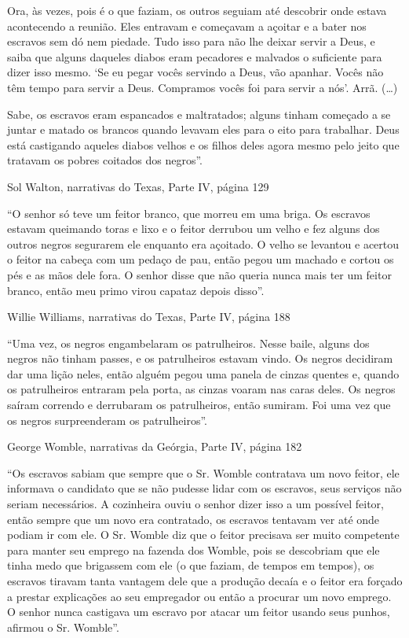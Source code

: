 Ora, às vezes, pois é o que faziam, os outros seguiam até descobrir onde
estava acontecendo a reunião. Eles entravam e começavam a açoitar e a
bater nos escravos sem dó nem piedade. Tudo isso para não lhe deixar
servir a Deus, e saiba que alguns daqueles diabos eram pecadores e
malvados o suficiente para dizer isso mesmo. `Se eu pegar vocês servindo
a Deus, vão apanhar. Vocês não têm tempo para servir a Deus. Compramos
vocês foi para servir a nós'. Arrã. (\ldots{})

Sabe, os escravos eram espancados e maltratados; alguns tinham começado
a se juntar e matado os brancos quando levavam eles para o eito para
trabalhar. Deus está castigando aqueles diabos velhos e os filhos deles
agora mesmo pelo jeito que tratavam os pobres coitados dos negros''.

Sol Walton, narrativas do Texas, Parte IV, página 129

``O senhor só teve um feitor branco, que morreu em uma briga. Os
escravos estavam queimando toras e lixo e o feitor derrubou um velho e
fez alguns dos outros negros segurarem ele enquanto era açoitado. O
velho se levantou e acertou o feitor na cabeça com um pedaço de pau,
então pegou um machado e cortou os pés e as mãos dele fora. O senhor
disse que não queria nunca mais ter um feitor branco, então meu primo
virou capataz depois disso''.

Willie Williams, narrativas do Texas, Parte IV, página 188

``Uma vez, os negros engambelaram os patrulheiros. Nesse baile, alguns
dos negros não tinham passes, e os patrulheiros estavam vindo. Os negros
decidiram dar uma lição neles, então alguém pegou uma panela de cinzas
quentes e, quando os patrulheiros entraram pela porta, as cinzas voaram
nas caras deles. Os negros saíram correndo e derrubaram os patrulheiros,
então sumiram. Foi uma vez que os negros surpreenderam os
patrulheiros''.

George Womble, narrativas da Geórgia, Parte IV, página 182

``Os escravos sabiam que sempre que o Sr. Womble contratava um novo
feitor, ele informava o candidato que se não pudesse lidar com os
escravos, seus serviços não seriam necessários. A cozinheira ouviu o
senhor dizer isso a um possível feitor, então sempre que um novo era
contratado, os escravos tentavam ver até onde podiam ir com ele. O Sr.
Womble diz que o feitor precisava ser muito competente para manter seu
emprego na fazenda dos Womble, pois se descobriam que ele tinha medo que
brigassem com ele (o que faziam, de tempos em tempos), os escravos
tiravam tanta vantagem dele que a produção decaía e o feitor era forçado
a prestar explicações ao seu empregador ou então a procurar um novo
emprego. O senhor nunca castigava um escravo por atacar um feitor usando
seus punhos, afirmou o Sr. Womble''.

